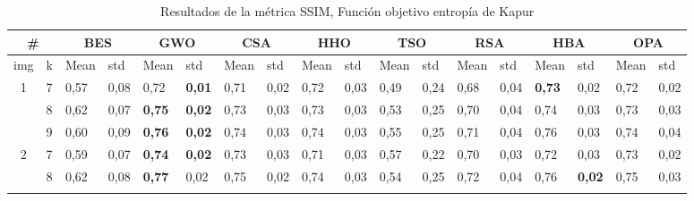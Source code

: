 \documentclass[conference]{IEEEtran}
\begin{document}
\begin{table*}[]
	\caption{Resultados de la métrica SSIM, Función objetivo entropía de Kapur}
	\begin{tabular}{|cl|ll|ll|ll|ll|ll|ll|ll|ll|}
		\hline
		\multicolumn{2}{|c|}{\#} & \multicolumn{2}{c|}{BES} & \multicolumn{2}{c|}{GWO} & \multicolumn{2}{c|}{CSA} & \multicolumn{2}{c|}{HHO} & \multicolumn{2}{c|}{TSO} & \multicolumn{2}{c|}{RSA} & \multicolumn{2}{c|}{HBA} & \multicolumn{2}{c|}{OPA} \\ \hline
		\multicolumn{1}{|l|}{img} & k & \multicolumn{1}{l|}{Mean} & std & \multicolumn{1}{l|}{Mean} & std & \multicolumn{1}{l|}{Mean} & std & \multicolumn{1}{l|}{Mean} & std & \multicolumn{1}{l|}{Mean} & std & \multicolumn{1}{l|}{Mean} & std & \multicolumn{1}{l|}{Mean} & std & \multicolumn{1}{l|}{Mean} & std \\ \hline
		\multicolumn{1}{|c|}{\multirow{3}{*}{1}} & 7 & \multicolumn{1}{l|}{0,57} & 0,08 & \multicolumn{1}{l|}{0,72} & \textbf{0,01} & \multicolumn{1}{l|}{0,71} & 0,02 & \multicolumn{1}{l|}{0,72} & 0,03 & \multicolumn{1}{l|}{0,49} & 0,24 & \multicolumn{1}{l|}{0,68} & 0,04 & \multicolumn{1}{l|}{\textbf{0,73}} & 0,02 & \multicolumn{1}{l|}{0,72} & 0,02 \\ \cline{2-18} 
		\multicolumn{1}{|c|}{} & 8 & \multicolumn{1}{l|}{0,62} & 0,07 & \multicolumn{1}{l|}{\textbf{0,75}} & \textbf{0,02} & \multicolumn{1}{l|}{0,73} & 0,03 & \multicolumn{1}{l|}{0,73} & 0,03 & \multicolumn{1}{l|}{0,53} & 0,25 & \multicolumn{1}{l|}{0,70} & 0,04 & \multicolumn{1}{l|}{0,74} & 0,03 & \multicolumn{1}{l|}{0,73} & 0,03 \\ \cline{2-18} 
		\multicolumn{1}{|c|}{} & 9 & \multicolumn{1}{l|}{0,60} & 0,09 & \multicolumn{1}{l|}{\textbf{0,76}} & \textbf{0,02} & \multicolumn{1}{l|}{0,74} & 0,03 & \multicolumn{1}{l|}{0,74} & 0,03 & \multicolumn{1}{l|}{0,55} & 0,25 & \multicolumn{1}{l|}{0,71} & 0,04 & \multicolumn{1}{l|}{0,76} & 0,03 & \multicolumn{1}{l|}{0,74} & 0,04 \\ \hline
		\multicolumn{1}{|c|}{\multirow{3}{*}{2}} & 7 & \multicolumn{1}{l|}{0,59} & 0,07 & \multicolumn{1}{l|}{\textbf{0,74}} & \textbf{0,02} & \multicolumn{1}{l|}{0,73} & 0,03 & \multicolumn{1}{l|}{0,71} & 0,03 & \multicolumn{1}{l|}{0,57} & 0,22 & \multicolumn{1}{l|}{0,70} & 0,03 & \multicolumn{1}{l|}{0,72} & 0,03 & \multicolumn{1}{l|}{0,73} & 0,02 \\ \cline{2-18} 
		\multicolumn{1}{|c|}{} & 8 & \multicolumn{1}{l|}{0,62} & 0,08 & \multicolumn{1}{l|}{\textbf{0,77}} & 0,02 & \multicolumn{1}{l|}{0,75} & 0,02 & \multicolumn{1}{l|}{0,74} & 0,03 & \multicolumn{1}{l|}{0,54} & 0,25 & \multicolumn{1}{l|}{0,72} & 0,04 & \multicolumn{1}{l|}{0,76} & \textbf{0,02} & \multicolumn{1}{l|}{0,75} & 0,03 \\ \cline{2-18} 

\end{tabular}
\end{table*}
\end{document}

